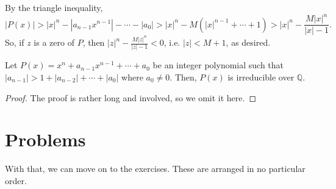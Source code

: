 \documentclass[11pt]{scrartcl}
\begin{document}
By the triangle inequality, \[|P(x)| > |x|^n - |a_{n-1}x^{n-1}| - \cdots - |a_0| > |x|^n - M(|x|^{n-1} + \cdots + 1) > |x|^n - \dfrac{M|x|^n}{|x|-1}.\] So, if $z$ is a zero of $P$, then $|z|^n - \tfrac{M|z|^n}{|z|-1} < 0$, i.e. $|z| < M + 1$, as desired.

\begin{theorem*}
Let $P(x) = x^n+a_{n-1}x^{n-1}+\cdots+a_0$ be an integer polynomial such that $|a_{n-1}| > 1+|a_{n-2}|+\cdots+|a_0|$ where $a_0 \neq 0$. Then, $P(x)$ is irreducible over $\mathbb{Q}$.
\end{theorem*}
\begin{proof}
The proof is rather long and involved, so we omit it here.
\end{proof}

\newpage

\section{Problems}

With that, we can move on to the exercises. These are arranged in no particular order.
\end{document}
